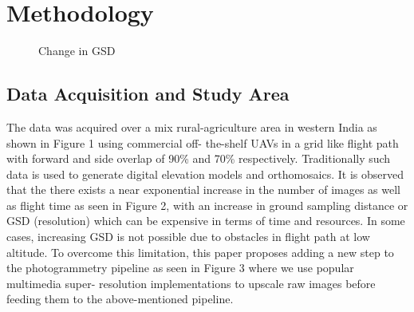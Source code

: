 \documentclass[conference]{IEEEtran}
\begin{document}
\section{Methodology}

\begin{figure}[htbp]
    \caption{Change in GSD}
    \label{gsd}
\end{figure}


\subsection{Data Acquisition and Study Area}

The data was acquired over a mix rural-agriculture area in
western India as shown in Figure 1 using commercial off-
the-shelf UAVs in a grid like flight path with forward and
side overlap of 90\% and 70\% respectively. Traditionally
such data is used to generate digital elevation models and
orthomosaics. It is observed that the there exists a near
exponential increase in the number of images as well as
flight time as seen in Figure 2, with an increase in ground
sampling distance or GSD (resolution) which can be
expensive in terms of time and resources. In some cases,
increasing GSD is not possible due to obstacles in flight
path at low altitude. To overcome this limitation, this paper
proposes adding a new step to the photogrammetry pipeline
as seen in Figure 3 where we use popular multimedia super-
resolution implementations to upscale raw images before
feeding them to the above-mentioned pipeline.
\end{document}
